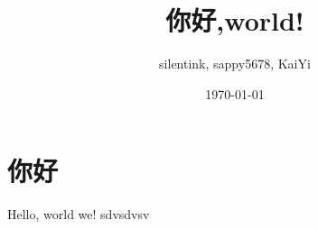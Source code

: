 \documentclass{article}
\title{你好,world!}
\author{silentink, sappy5678, KaiYi}
\date{\today}
\begin{document}
\maketitle

\section{你好}
Hello, world we!
sdvsdvsv
\end{document}
